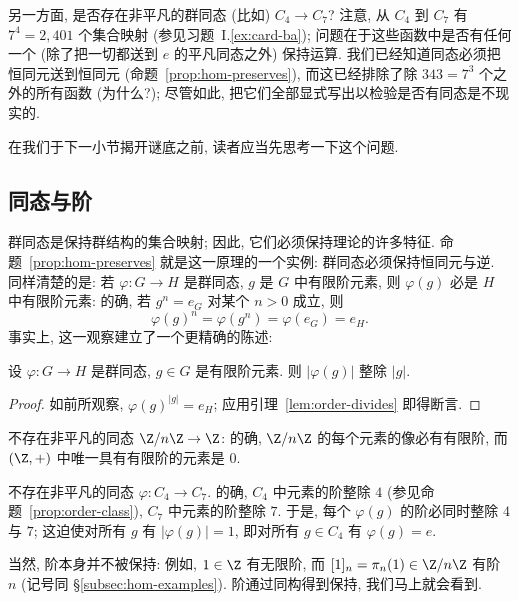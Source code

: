 另一方面, 是否存在非平凡的群同态 (比如) $C_4 \rightarrow C_7$? 注意, 从 $C_4$ 到 $C_7$ 有 $7^4 = 2{,}401$ 个集合映射 (参见习题~I.\ref{ex:card-ba}); 问题在于这些函数中是否有任何一个 (除了把一切都送到 $e$ 的平凡同态之外) 保持运算. 我们已经知道同态必须把恒同元送到恒同元 (命题~\ref{prop:hom-preserves}), 而这已经排除了除 $343=7^3$ 个之外的所有函数 (为什么?); 尽管如此, 把它们全部显式写出以检验是否有同态是不现实的.

在我们于下一小节揭开谜底之前, 读者应当先思考一下这个问题.

\subsection{同态与阶}
\label{subsec:hom-order}

群同态是保持群结构的集合映射; 因此, 它们必须保持理论的许多特征. 命题~\ref{prop:hom-preserves} 就是这一原理的一个实例: 群同态必须保持恒同元与逆. 同样清楚的是: 若 $\varphi : G \to H$ 是群同态, $g$ 是 $G$ 中有限阶元素, 则 $\varphi(g)$ 必是 $H$ 中有限阶元素: 的确, 若 $g^n = e_G$ 对某个 $n > 0$ 成立, 则
\[
\varphi(g)^n = \varphi(g^n) = \varphi(e_G) = e_H.
\]
事实上, 这一观察建立了一个更精确的陈述:

\begin{proposition}
\label{prop:hom-order}
设 $\varphi : G \to H$ 是群同态, $g \in G$ 是有限阶元素. 则 $|\varphi(g)|$ 整除 $|g|$.
\end{proposition}

\begin{proof}
如前所观察, $\varphi(g)^{|g|} = e_H$; 应用引理~\ref{lem:order-divides} 即得断言.
\end{proof}

\begin{example}
\label{ex:no-hom-zn-z}
不存在非平凡的同态 $\Z/n\Z \to \Z$: 的确, $\Z/n\Z$ 的每个元素的像必有有限阶, 而 $(\Z, +)$ 中唯一具有有限阶的元素是 $0$.

不存在非平凡的同态 $\varphi : C_4 \to C_7$. 的确, $C_4$ 中元素的阶整除 $4$ (参见命题~\ref{prop:order-class}), $C_7$ 中元素的阶整除 $7$. 于是, 每个 $\varphi(g)$ 的阶必同时整除 $4$ 与 $7$; 这迫使对所有 $g$ 有 $|\varphi(g)| = 1$, 即对所有 $g \in C_4$ 有 $\varphi(g) = e$.
\end{example}

当然, 阶本身并不被保持: 例如, $1 \in \Z$ 有无限阶, 而 $[1]_n = \pi_n(1) \in \Z/n\Z$ 有阶 $n$ (记号同 \S\ref{subsec:hom-examples}). 阶通过同构得到保持, 我们马上就会看到.


